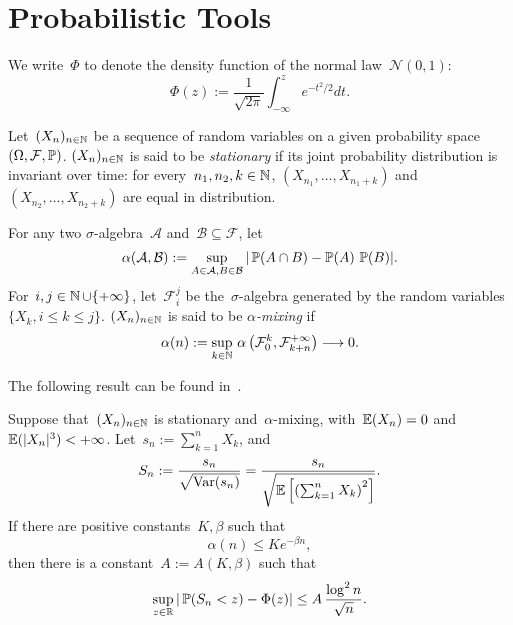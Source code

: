 \documentclass{article}
\begin{document}



\clearpage
\appendix

\section{Probabilistic Tools} \label{appendix:proba}
 



We write~$\Phi$ to denote the density function of the normal law~$\mathcal{N}(0,1)$:
\begin{equation} \label{eq:phi}
    \Phi(z) := \frac{1}{\sqrt{2\pi}} \int_{-\infty}^z e^{-t^2/2} dt.
\end{equation}

Let~$(X_n)_{n \in \operatorname{\mathbb{N}}}$ be a sequence of random variables on a given probability space~$(\Omega,\mathcal{F},\operatorname{\mathbb{P}})$. $(X_n)_{n \in \operatorname{\mathbb{N}}}$ is said to be {\em stationary} if its joint probability distribution is invariant over time: for every~$n_1,n_2,k \in \operatorname{\mathbb{N}}$, $(X_{n_1},\ldots,X_{n_1+k})$ and~$(X_{n_2},\ldots,X_{n_2+k})$ are equal in distribution. 

For any two $\sigma$-algebra~$\mathcal{A}$ and~$\mathcal{B} \subseteq \mathcal{F}$, let
\begin{equation*}
    \alpha(\mathcal{A},\mathcal{B}) := \sup_{A \in \mathcal{A}, B \in \mathcal{B}} |\operatorname{\mathbb{P}}(A\cap B) - \operatorname{\mathbb{P}}(A) \, \operatorname{\mathbb{P}}(B)|.
\end{equation*}
For~$i,j \in \operatorname{\mathbb{N}} \cup \{+\infty\}$, let~$\mathcal{F}_i^j$ be the~$\sigma$-algebra generated by the random variables~$\{X_k, i \leq k \leq j\}$.
$(X_n)_{n \in \operatorname{\mathbb{N}}}$ is said to be {\em $\alpha$-mixing} if
\begin{equation*}
    \alpha(n) := \sup_{k \in \operatorname{\mathbb{N}}} \, \alpha \left(  \mathcal{F}_{0}^{k} , \mathcal{F}_{k+n}^{+\infty} \right) \longrightarrow 0.
\end{equation*}





The following result can be found in~\cite[Theorem 2 with~$\delta=1$]{tikhomirov_convergence_1981}.
\begin{theorem}  \label{thm:alpha_mixing_berry_esseen}
    Suppose that~$(X_n)_{n \in \operatorname{\mathbb{N}}}$ is stationary and~$\alpha$-mixing, with~$\operatorname{\mathbb{E}}(X_n) = 0$ and~$\operatorname{\mathbb{E}}(|X_n|^3) < +\infty$.
    Let~$s_n := \sum_{k=1}^n X_k$, and
    \begin{equation*}
        S_n := \frac{s_n}{\sqrt{\mathrm{Var}(s_n)}} = \frac{s_n}{\sqrt{\operatorname{\mathbb{E}}\left[\left( \sum_{k=1}^n X_k  \right)^2\right]}}.
    \end{equation*}
    If there are positive constants~$K,\beta$ such that
    \begin{equation*}
        \alpha(n) \leq K e^{-\beta n},
    \end{equation*}
    then there is a constant~$A := A(K,\beta)$ such that
    \begin{equation*}
        \sup_{z \in \operatorname{\mathbb{R}}} |\operatorname{\mathbb{P}}(S_n < z) - \Phi(z)| \leq A \, \frac{\log^2 n}{\sqrt{n}}.
    \end{equation*}
\end{theorem}
\end{document}
